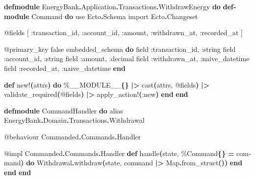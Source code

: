 \documentclass[11pt,a4paper,greek,twoside]{template-xe}
\newenvironment{Shaded}{\begin{english}\begin{snugshade}}{\end{snugshade}\end{english}}
\newcommand{\ConstantTok}[1]{\textcolor[rgb]{0.56,0.35,0.01}{#1}}
\newcommand{\FunctionTok}[1]{\textcolor[rgb]{0.13,0.29,0.53}{\textbf{#1}}}
\newcommand{\ImportTok}[1]{#1}
\newcommand{\KeywordTok}[1]{\textcolor[rgb]{0.13,0.29,0.53}{\textbf{#1}}}
\newcommand{\NormalTok}[1]{#1}
\newcommand{\OperatorTok}[1]{\textcolor[rgb]{0.81,0.36,0.00}{\textbf{#1}}}
\newcommand{\OtherTok}[1]{\textcolor[rgb]{0.56,0.35,0.01}{#1}}
\newcommand{\VariableTok}[1]{\textcolor[rgb]{0.00,0.00,0.00}{#1}}
\begin{document}
\begin{Shaded}
\begin{Highlighting}[]
\KeywordTok{defmodule} \ConstantTok{EnergyBank}\OperatorTok{.}\ConstantTok{Application}\OperatorTok{.}\ConstantTok{Transactions}\OperatorTok{.}\ConstantTok{WithdrawEnergy} \KeywordTok{do}
  \KeywordTok{defmodule} \ConstantTok{Command} \KeywordTok{do}
    \ImportTok{use} \ConstantTok{Ecto}\OperatorTok{.}\ConstantTok{Schema}
    \ImportTok{import} \ConstantTok{Ecto}\OperatorTok{.}\ConstantTok{Changeset}

    \OtherTok{@fields} \OtherTok{[}
      \VariableTok{:transaction\_id}\NormalTok{,}
      \VariableTok{:account\_id}\NormalTok{,}
      \VariableTok{:amount}\NormalTok{,}
      \VariableTok{:withdrawn\_at}\NormalTok{,}
      \VariableTok{:recorded\_at}
    \OtherTok{]}

    \OtherTok{@primary\_key} \ConstantTok{false}
\NormalTok{    embedded\_schema }\KeywordTok{do}
\NormalTok{      field }\VariableTok{:transaction\_id}\NormalTok{, }\VariableTok{:string}
\NormalTok{      field }\VariableTok{:account\_id}\NormalTok{, }\VariableTok{:string}
\NormalTok{      field }\VariableTok{:amount}\NormalTok{, }\VariableTok{:decimal}
\NormalTok{      field }\VariableTok{:withdrawn\_at}\NormalTok{, }\VariableTok{:naive\_datetime}
\NormalTok{      field }\VariableTok{:recorded\_at}\NormalTok{, }\VariableTok{:naive\_datetime}
    \KeywordTok{end}

    \KeywordTok{def}\NormalTok{ new!}\FunctionTok{(}\NormalTok{attrs}\FunctionTok{)} \KeywordTok{do}
\NormalTok{      \%}\ConstantTok{\_\_MODULE\_\_}\FunctionTok{\{\}}
      \OperatorTok{|\textgreater{}}\NormalTok{ cast}\FunctionTok{(}\NormalTok{attrs, }\OtherTok{@fields}\FunctionTok{)}
      \OperatorTok{|\textgreater{}}\NormalTok{ validate\_required}\FunctionTok{(}\OtherTok{@fields}\FunctionTok{)}
      \OperatorTok{|\textgreater{}}\NormalTok{ apply\_action!}\FunctionTok{(}\VariableTok{:new}\FunctionTok{)}
    \KeywordTok{end}
  \KeywordTok{end}

  \KeywordTok{defmodule} \ConstantTok{CommandHandler} \KeywordTok{do}
    \ImportTok{alias} \ConstantTok{EnergyBank}\OperatorTok{.}\ConstantTok{Domain}\OperatorTok{.}\ConstantTok{Transactions}\OperatorTok{.}\ConstantTok{Withdrawal}

    \OtherTok{@behaviour} \ConstantTok{Commanded}\OperatorTok{.}\ConstantTok{Commands}\OperatorTok{.}\ConstantTok{Handler}

    \OtherTok{@impl} \ConstantTok{Commanded}\OperatorTok{.}\ConstantTok{Commands}\OperatorTok{.}\ConstantTok{Handler}
    \KeywordTok{def}\NormalTok{ handle}\FunctionTok{(}\NormalTok{state, \%}\ConstantTok{Command}\FunctionTok{\{\}} \OperatorTok{=}\NormalTok{ command}\FunctionTok{)} \KeywordTok{do}
      \ConstantTok{Withdrawal}\OperatorTok{.}\NormalTok{withdraw}\FunctionTok{(}\NormalTok{state, command }\OperatorTok{|\textgreater{}} \ConstantTok{Map}\OperatorTok{.}\NormalTok{from\_struct}\FunctionTok{())}
    \KeywordTok{end}
  \KeywordTok{end}
\KeywordTok{end}
\end{Highlighting}
\end{Shaded}
\end{document}
